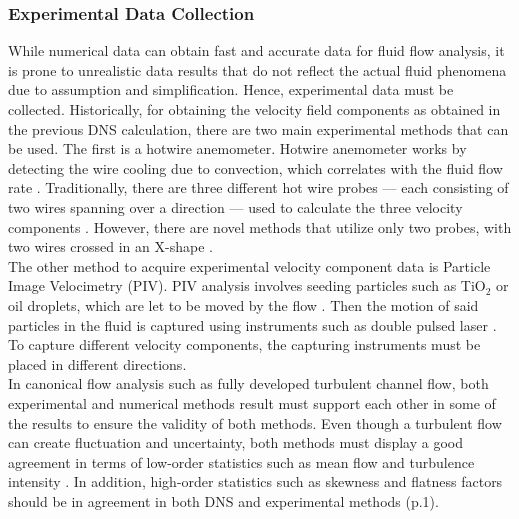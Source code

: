 \documentclass[11pt]{article}
\begin{document}
\subsubsection{Experimental Data Collection}
While numerical data can obtain fast and accurate data for fluid flow analysis, it is prone to unrealistic data results that do not reflect the actual fluid phenomena due to assumption and simplification. Hence, experimental data must be collected. Historically, for obtaining the velocity field components as obtained in the previous DNS calculation, there are two main experimental methods that can be used. The first is a hotwire anemometer. Hotwire anemometer works by detecting the wire cooling due to convection, which correlates with the fluid flow rate \citep{Bird1993}. Traditionally, there are three different hot wire probes --- each consisting of two wires spanning over a direction --- used to calculate the three velocity components \citep{Hodson2023}. However, there are novel methods that utilize only two probes, with two wires crossed in an X-shape \citep{ElGabry2014}. \\
\newline
\noindent The other method to acquire experimental velocity component data is Particle Image Velocimetry (PIV). PIV analysis involves seeding particles such as TiO$_2$ or oil droplets, which are let to be moved by the flow \citep{Melling1997}. Then the motion of said particles in the fluid is captured using instruments such as double pulsed laser \citep{Dantec2023}. To capture different velocity components, the capturing instruments must be placed in different directions.\\
\newline
\noindent In canonical flow analysis such as fully developed turbulent channel flow, both experimental and numerical methods result must support each other in some of the results to ensure the validity of both methods. Even though a turbulent flow can create fluctuation and uncertainty, both methods must display a good agreement in terms of low-order statistics such as mean flow and turbulence intensity \citep{Eggels1994}. In addition, high-order statistics such as skewness and flatness factors should be in agreement in both DNS and experimental methods (p.1). 
\end{document}
